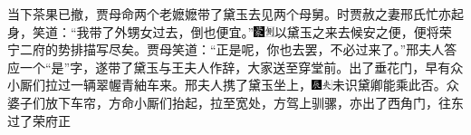 当下茶果已撤，贾母命两个老嬷嬷带了黛玉去见两个母舅。时贾赦之妻邢氏忙亦起身，笑道：``我带了外甥女过去，倒也便宜。''{\includegraphics[width=3mm]{../Images/00006}\includegraphics[width=3mm]{../Images/00011}\footnotesize \kaishu 以黛玉之来去候安之便，便将荣宁二府的势排描写尽矣。}贾母笑道：``正是呢，你也去罢，不必过来了。''邢夫人答应一个``是''字，遂带了黛玉与王夫人作辞，大家送至穿堂前。出了垂花门，早有众小厮们拉过一辆翠幄青紬车来。邢夫人携了黛玉坐上，{\includegraphics[width=3mm]{../Images/00009}\includegraphics[width=3mm]{../Images/00012}\footnotesize \kaishu 未识黛卿能乘此否。}众婆子们放下车帘，方命小厮们抬起，拉至宽处，方驾上驯骡，亦出了西角门，往东过了荣府正